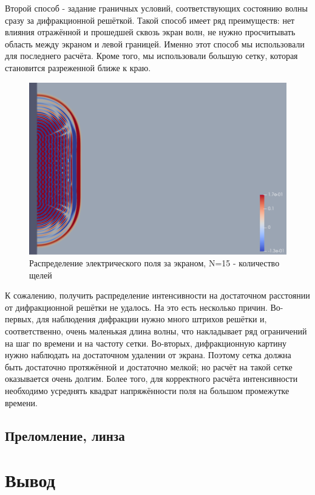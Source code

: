 \documentclass[
11pt,%
tightenlines,%
twoside,%
onecolumn,%
nofloats,%
nobibnotes,%
nofootinbib,%
superscriptaddress,%
noshowpacs,%
centertags]%
{revtex4}
\begin{document}
Второй способ - задание граничных условий, соответствующих состоянию волны сразу за дифракционной 
решёткой. Такой способ имеет ряд преимуществ: нет влияния отражённой и прошедшей сквозь экран волн, 
не нужно просчитывать область между экраном и левой границей. Именно этот способ мы использовали для 
последнего расчёта. Кроме того, мы использовали большую сетку, которая становится разреженной ближе
к краю.
\newpage
\begin{figure}[h]
    \centering
    \includegraphics[width=13cm]{N=15__27.png}
    \caption{Распределение электрического поля за экраном, N=15 - количество щелей}
    \label{fig:1}
\end{figure}
К сожалению, получить распределение интенсивности на достаточном расстоянии от дифракционной решётки не удалось. 
На это есть несколько причин. Во-первых, для наблюдения дифракции нужно много штрихов решётки 
и, соответственно, очень маленькая длина волны, что накладывает ряд ограничений на шаг по времени 
и на частоту сетки. Во-вторых, дифракционную картину нужно наблюдать на достаточном удалении от 
экрана. Поэтому сетка должна быть достаточно протяжённой и достаточно мелкой; но расчёт на такой сетке 
оказывается очень долгим. Более того, для корректного расчёта интенсивности необходимо усреднять 
квадрат напряжённости поля на большом промежутке времени. 

\subsection{Преломление, линза}



\section{Вывод}
\end{document}
